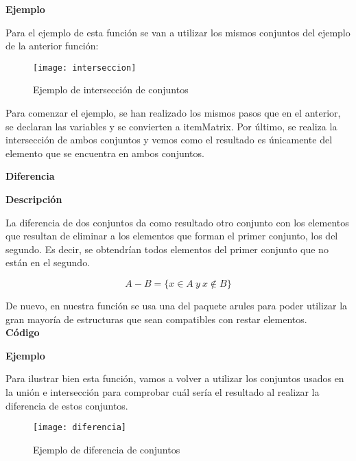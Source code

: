     
    \clearpage

    \textbf{Ejemplo}

    Para el ejemplo de esta funci\'on se van a utilizar los mismos conjuntos del ejemplo de la anterior funci\'on:

    \begin{figure}[H]
        \centering
        \texttt{[image: interseccion]}
        \caption{Ejemplo de intersecci\'on de conjuntos}
        \label{fig:interseccion}
    \end{figure}

    Para comenzar el ejemplo, se han realizado los mismos pasos que en el anterior, se declaran las variables y se convierten a 
    itemMatrix. 
    Por \'ultimo, se realiza la intersecci\'on de ambos conjuntos y vemos como el resultado es \'unicamente del elemento que se encuentra 
    en ambos conjuntos.

    \clearpage

\textbf{ \large Diferencia}

\smallskip

    \textbf{Descripci\'on}

    La diferencia de dos conjuntos da como resultado otro conjunto con los elementos que resultan de 
    eliminar a los elementos que forman el primer conjunto, los del segundo. Es decir, se obtendr\'ian 
    todos elementos del primer conjunto que no est\'an en el segundo.

    \[
        A - B = \{x\in A ~ y ~ x\notin B \}
    \]

    De nuevo, en nuestra funci\'on se usa una del paquete arules para poder utilizar la gran mayor\'ia de estructuras 
    que sean compatibles con restar elementos.
    \\


    \textbf{C\'odigo}

    
    \bigskip

    \textbf{Ejemplo}

    Para ilustrar bien esta funci\'on, vamos a volver a utilizar los conjuntos usados en la uni\'on e intersecci\'on para comprobar 
    cu\'al ser\'ia el resultado al realizar la diferencia de estos conjuntos.

    \begin{figure}[H]
        \centering
        \texttt{[image: diferencia]}
        \caption{Ejemplo de diferencia de conjuntos}
        \label{fig:diferencia}
    \end{figure}

